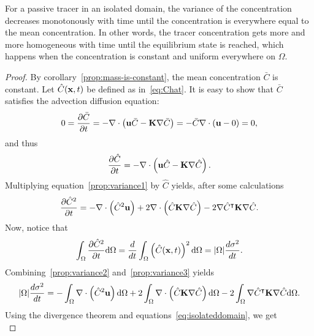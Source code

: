 \begin{property}
	For a passive tracer in an isolated domain, the variance of the concentration decreases monotonously with time until the concentration is everywhere equal to the mean concentration. In other words, the tracer concentration gets more and more homogeneous with time until the equilibrium state is reached, which happens when the concentration is constant and uniform everywhere on $\Omega$.
\end{property}
\begin{proof}
	By corollary~\ref{prop:mass-is-constant}, the mean concentration $\bar C$ is constant. Let $\hat C(\mathbf x,t)$ be defined as in~\eqref{eq:Chat}. It is easy to show that $\bar C$ satisfies the advection diffusion equation:
	 \begin{equation}
	 	0 = \frac{\partial \bar C}{\partial t} = -\nabla \cdot \left(\mathbf u \bar C - \mathbf K \nabla \bar C\right) = - \bar C \nabla \cdot (\mathbf u - 0) = 0,
	 \end{equation}
	 and thus
	 \begin{equation} \label{prop:variance1}
	 	\frac{\partial \hat C}{\partial t} = -\nabla \cdot \left(\mathbf u \hat C - \mathbf K \nabla \hat C\right).
	 \end{equation}
	 Multiplying equation~\eqref{prop:variance1} by $\hat C$ yields, after some calculations
	 \begin{equation} \label{prop:variance2}
	 	\frac{\partial \hat C^2}{\partial t} = - \nabla \cdot \left(\hat C^2 \mathbf u \right) + 2\nabla \cdot \left(\hat C \mathbf K \nabla \hat C \right) - 2 \nabla \hat C^\intercal \mathbf K \nabla \hat C.
	 \end{equation}
	 Now, notice that
	 \begin{equation} \label{prop:variance3}
	 	\int_{\Omega} \frac{\partial \hat C^2}{\partial t} \mathrm d\Omega = \frac{d}{dt} \int_{\Omega} \left( \hat C(\mathbf x,t) \right)^2 \mathrm d\Omega = |\Omega|\frac{d\sigma^2}{dt}.
	 \end{equation}
	 Combining~\eqref{prop:variance2} and~\eqref{prop:variance3} yields
	 \begin{equation}
	 	|\Omega|\frac{d\sigma^2}{dt} = - \int_{\Omega} \nabla \cdot \left(\hat C^2 \mathbf u \right) \mathrm d\Omega + 2 \int_{\Omega} \nabla \cdot \left(\hat C \mathbf K \nabla \hat C \right) \mathrm d\Omega -2 \int_{\Omega} \nabla \hat C^\intercal \mathbf K \nabla \hat C \mathrm d\Omega.
	 \end{equation}
	 Using the divergence theorem and equations~\eqref{eq:isolateddomain}, we get
	 \begin{equation}

\end{equation}
\end{proof}
